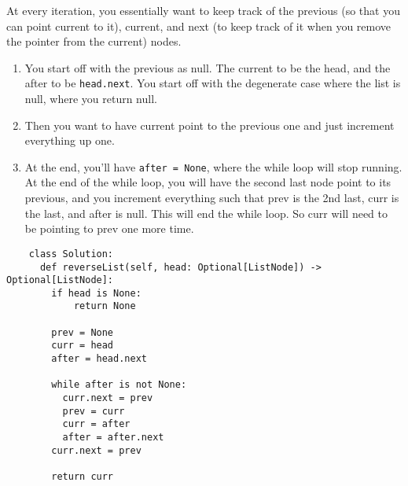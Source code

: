 \documentclass{article}
\begin{document}
\begin{theorem}
  At every iteration, you essentially want to keep track of the previous (so that you can point current to it), current, and next (to keep track of it when you remove the pointer from the current) nodes. 
  \begin{enumerate}
    \item You start off with the previous as null. The current to be the head, and the after to be \texttt{head.next}. You start off with the degenerate case where the list is null, where you return null. 
    \item Then you want to have current point to the previous one and just increment everything up one. 
    \item At the end, you'll have \texttt{after = None}, where the while loop will stop running. At the end of the while loop, you will have the second last node point to its previous, and you increment everything such that prev is the 2nd last, curr is the last, and after is null. This will end the while loop. So curr will need to be pointing to prev one more time. 
  \end{enumerate}
  \begin{lstlisting}
    class Solution:
      def reverseList(self, head: Optional[ListNode]) -> Optional[ListNode]:
        if head is None: 
            return None 

        prev = None 
        curr = head 
        after = head.next 
        
        while after is not None: 
          curr.next = prev 
          prev = curr 
          curr = after 
          after = after.next
        curr.next = prev 

        return curr
  \end{lstlisting} 
\end{theorem}
\end{document}
